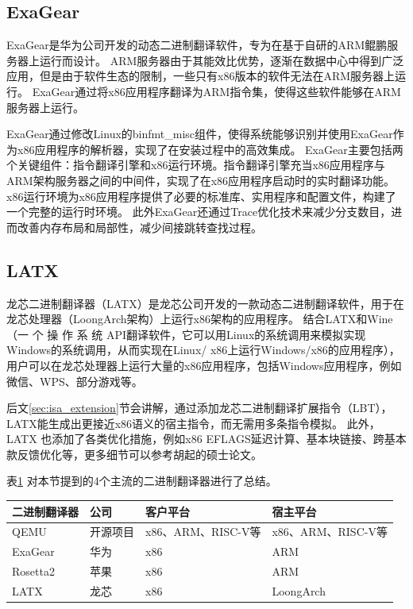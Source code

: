 \subsection{ExaGear}

ExaGear是华为公司开发的动态二进制翻译软件，专为在基于自研的ARM鲲鹏服务器上运行而设计。
ARM服务器由于其能效比优势，逐渐在数据中心中得到广泛应用，但是由于软件生态的限制，一些只有x86版本的软件无法在ARM服务器上运行。
ExaGear通过将x86应用程序翻译为ARM指令集，使得这些软件能够在ARM服务器上运行。

ExaGear通过修改Linux的binfmt\_misc组件，使得系统能够识别并使用ExaGear作为x86应用程序的解析器，实现了在安装过程中的高效集成。
ExaGear主要包括两个关键组件：指令翻译引擎和x86运行环境。指令翻译引擎充当x86应用程序与ARM架构服务器之间的中间件，实现了在x86应用程序启动时的实时翻译功能。
x86运行环境为x86应用程序提供了必要的标准库、实用程序和配置文件，构建了一个完整的运行时环境。
此外ExaGear还通过Trace优化技术来减少分支数目，进而改善内存布局和局部性，减少间接跳转查找过程\cite{LvYandong2021}。

\subsection{LATX}

龙芯二进制翻译器（LATX）是龙芯公司开发的一款动态二进制翻译软件，用于在龙芯处理器（LoongArch架构）上运行x86架构的应用程序。
结合LATX和Wine\cite{amstadt1994wine}（一 个 操 作 系 统 API翻译软件，它可以用Linux的系统调用来模拟实现Windows的系统调用，从而实现在Linux/ x86上运行Windows/x86的应用程序），
用户可以在龙芯处理器上运行大量的x86应用程序，包括Windows应用程序，例如微信、WPS、部分游戏等。

后文\ref{sec:isa_extension}节会讲解，通过添加龙芯二进制翻译扩展指令（LBT），LATX能生成出更接近x86语义的宿主指令，而无需用多条指令模拟。
此外，LATX 也添加了各类优化措施，例如x86 EFLAGS延迟计算、基本块链接、跨基本款反馈优化等，更多细节可以参考胡起的硕士论文\cite{HuQi2023}。

表\ref{tab:BTs} 对本节提到的4个主流的二进制翻译器进行了总结。

\begin{table}[!htbp]
  \centering
  \footnotesize%
  \setlength{\tabcolsep}{4pt}%
  \renewcommand{\arraystretch}{1.2}%
  \label{tab:BTs}
    \begin{tabular}{llll}
    \hline
    二进制翻译器    & 公司   & 客户平台           & 宿主平台           \\ \hline
    QEMU      & 开源项目 & x86、ARM、RISC-V等 & x86、ARM、RISC-V等  \\
    ExaGear   & 华为   & x86            & ARM            \\
    Rosetta2  & 苹果   & x86            & ARM            \\
    LATX & 龙芯   & x86            & LoongArch      \\ \hline
    \end{tabular}
    \end{table}


